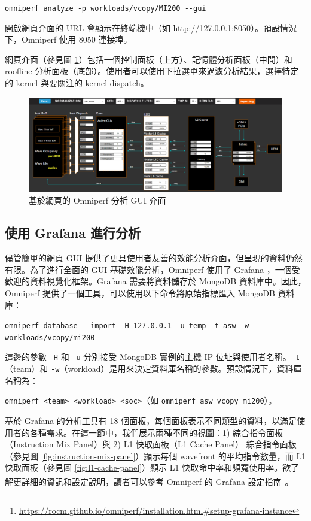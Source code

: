 \lstinline|omniperf analyze -p workloads/vcopy/MI200 --gui|

開啟網頁介面的 URL 會顯示在終端機中（如 \url{http://127.0.0.1:8050}）。預設情況下，Omniperf 使用 8050 連接埠。

網頁介面（參見圖 \ref{fig:omniperf-web-interface}）包括一個控制面板（上方）、記憶體分析面板（中間）和 roofline 分析面板（底部）。使用者可以使用下拉選單來過濾分析結果，選擇特定的 kernel 與要關注的 kernel dispatch。

\begin{figure}
    \centering
    \includegraphics[width=1\linewidth]{Appendici/OmniperfWebInterface.png}
    \caption{基於網頁的 Omniperf 分析 GUI 介面}
    \label{fig:omniperf-web-interface}
\end{figure}


\subsection{使用 Grafana 進行分析}
儘管簡單的網頁 GUI 提供了更具使用者友善的效能分析介面，但呈現的資料仍然有限。為了進行全面的 GUI 基礎效能分析，Omniperf 使用了 Grafana \cite{chakraborty2021grafana}，一個受歡迎的資料視覺化框架。Grafana 需要將資料儲存於 MongoDB 資料庫中。因此，Omniperf 提供了一個工具，可以使用以下命令將原始指標匯入 MongoDB 資料庫：

\lstinline|omniperf database --import -H 127.0.0.1 -u temp -t asw -w workloads/vcopy/mi200|

這邊的參數 \lstinline|-H| 和 \lstinline|-u| 分別接受 MongoDB 實例的主機 IP 位址與使用者名稱。\lstinline|-t|（team）和 \lstinline|-w|（workload）是用來決定資料庫名稱的參數。預設情況下，資料庫名稱為：

\lstinline|omniperf_<team>_<workload>_<soc>|（如 \lstinline|omniperf_asw_vcopy_mi200|）。

基於 Grafana 的分析工具有 18 個面板，每個面板表示不同類型的資料，以滿足使用者的各種需求。在這一節中，我們展示兩種不同的視圖：1) 綜合指令面板（Instruction Mix Panel）與 2) L1 快取面板（L1 Cache Panel）
綜合指令面板（參見圖 \ref{fig:instruction-mix-panel}）顯示每個 wavefront 的平均指令數量，而 L1 快取面板（參見圖 \ref{fig:l1-cache-panel}）顯示 L1 快取命中率和頻寬使用率。欲了解更詳細的資訊和設定說明，讀者可以參考 Omniperf 的 Grafana 設定指南\footnote{\url{https://rocm.github.io/omniperf/installation.html#setup-grafana-instance}}。

